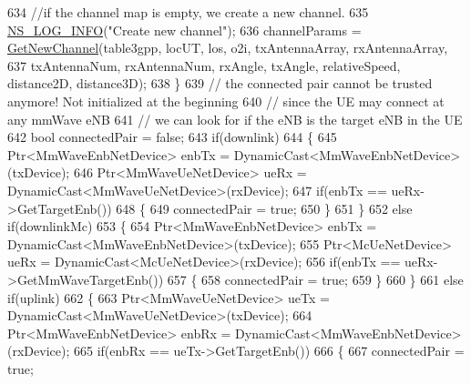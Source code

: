 \begin{DoxyCode}
634                         \textcolor{comment}{//if the channel map is empty, we create a new channel.}
635                         \hyperlink{group__logging_gafbd73ee2cf9f26b319f49086d8e860fb}{NS\_LOG\_INFO}(\textcolor{stringliteral}{"Create new channel"});
636                         channelParams = \hyperlink{classns3_1_1MmWave3gppChannel_aef5bd6982d739715d7bbba3166e75116}{GetNewChannel}(table3gpp, locUT, los, o2i, 
      txAntennaArray, rxAntennaArray,
637                                         txAntennaNum, rxAntennaNum, rxAngle, txAngle, relativeSpeed, 
      distance2D, distance3D);
638                 \}
639                 \textcolor{comment}{// the connected pair cannot be trusted anymore! Not initialized at the beginning}
640                 \textcolor{comment}{// since the UE may connect at any mmWave eNB}
641                 \textcolor{comment}{// we can look for if the eNB is the target eNB in the UE}
642                 \textcolor{keywordtype}{bool} connectedPair = \textcolor{keyword}{false};
643                 \textcolor{keywordflow}{if}(downlink)
644                 \{
645                         Ptr<MmWaveEnbNetDevice> enbTx = DynamicCast<MmWaveEnbNetDevice>(txDevice);
646                         Ptr<MmWaveUeNetDevice> ueRx = DynamicCast<MmWaveUeNetDevice>(rxDevice);
647                         \textcolor{keywordflow}{if}(enbTx == ueRx->GetTargetEnb())
648                         \{
649                                 connectedPair = \textcolor{keyword}{true};
650                         \}       
651                 \}
652                 \textcolor{keywordflow}{else} \textcolor{keywordflow}{if}(downlinkMc)
653                 \{
654                         Ptr<MmWaveEnbNetDevice> enbTx = DynamicCast<MmWaveEnbNetDevice>(txDevice);
655                         Ptr<McUeNetDevice> ueRx = DynamicCast<McUeNetDevice>(rxDevice);
656                         \textcolor{keywordflow}{if}(enbTx == ueRx->GetMmWaveTargetEnb())
657                         \{
658                                 connectedPair = \textcolor{keyword}{true};
659                         \}       
660                 \}
661                 \textcolor{keywordflow}{else} \textcolor{keywordflow}{if}(uplink)
662                 \{
663                         Ptr<MmWaveUeNetDevice> ueTx = DynamicCast<MmWaveUeNetDevice>(txDevice);
664                         Ptr<MmWaveEnbNetDevice> enbRx = DynamicCast<MmWaveEnbNetDevice>(rxDevice);
665                         \textcolor{keywordflow}{if}(enbRx == ueTx->GetTargetEnb())
666                         \{
667                                 connectedPair = \textcolor{keyword}{true};

\end{DoxyCode}

